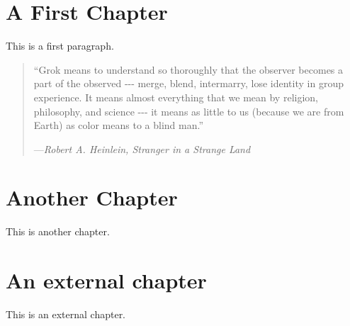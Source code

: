 \documentclass[10pt,a4paper,english]{manual}
\newcommand{\titlereference}[1]{\textsl{#1}}
\begin{document}

\section{A First Chapter}

This is a first paragraph.
\begin{quote}

``Grok means to understand so thoroughly that the observer becomes a
part of the observed -{}-{}- merge, blend, intermarry, lose identity in
group experience. It means almost everything that we mean by religion,
philosophy, and science -{}-{}- it means as little to us (because we are from
Earth) as color means to a blind man.''

\begin{flushright}
---\titlereference{Robert A. Heinlein, Stranger in a Strange Land}
\end{flushright}
\end{quote}



\section{Another Chapter}

This is another chapter.



\section{An external chapter}

This is an external chapter.
\end{document}
